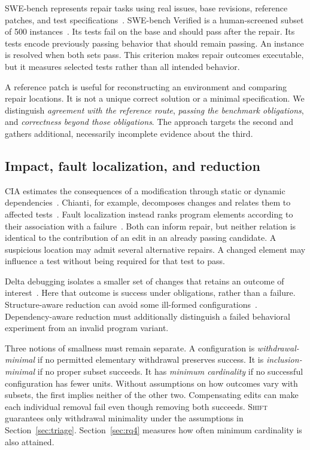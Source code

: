 \documentclass[a4paper,fleqn]{cas-sc}
\newcommand{\tool}{\textsc{Shift}}
\newcommand{\code}[1]{\texttt{\detokenize{#1}}}
\begin{document}
SWE-bench represents repair tasks using real issues, base revisions, reference patches, and test specifications~\citep{jimenez2024swebench}. SWE-bench Verified is a human-screened subset of 500 instances~\citep{chowdhury2024verified}. Its \code{FAIL_TO_PASS} tests fail on the base and should pass after the repair. Its \code{PASS_TO_PASS} tests encode previously passing behavior that should remain passing. An instance is resolved when both sets pass. This criterion makes repair outcomes executable, but it measures selected tests rather than all intended behavior.

A reference patch is useful for reconstructing an environment and comparing repair locations. It is not a unique correct solution or a minimal specification. We distinguish \emph{agreement with the reference route}, \emph{passing the benchmark obligations}, and \emph{correctness beyond those obligations}. The approach targets the second and gathers additional, necessarily incomplete evidence about the third.

\subsection{Impact, fault localization, and reduction}\label{sec:foundations}

CIA estimates the consequences of a modification through static or dynamic dependencies~\citep{li2013cia,orso2003field}. Chianti, for example, decomposes changes and relates them to affected tests~\citep{ren2004chianti}. Fault localization instead ranks program elements according to their association with a failure~\citep{wong2016fl}. Both can inform repair, but neither relation is identical to the contribution of an edit in an already passing candidate. A suspicious location may admit several alternative repairs. A changed element may influence a test without being required for that test to pass.

Delta debugging isolates a smaller set of changes that retains an outcome of interest~\citep{zeller1999yesterday,zeller2002ddmin}. Here that outcome is success under obligations, rather than a failure. Structure-aware reduction can avoid some ill-formed configurations~\citep{misherghi2006hdd}. Dependency-aware reduction must additionally distinguish a failed behavioral experiment from an invalid program variant.

Three notions of smallness must remain separate. A configuration is \emph{withdrawal-minimal} if no permitted elementary withdrawal preserves success. It is \emph{inclusion-minimal} if no proper subset succeeds. It has \emph{minimum cardinality} if no successful configuration has fewer units. Without assumptions on how outcomes vary with subsets, the first implies neither of the other two. Compensating edits can make each individual removal fail even though removing both succeeds. \tool{} guarantees only withdrawal minimality under the assumptions in Section~\ref{sec:triage}. Section~\ref{sec:rq4} measures how often minimum cardinality is also attained.
\end{document}
